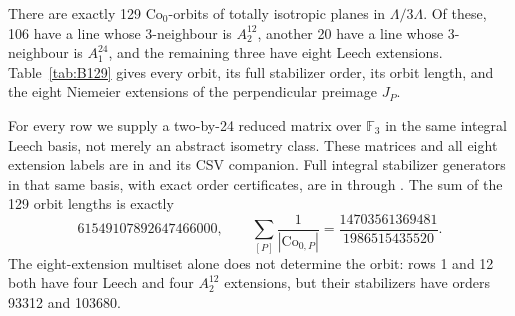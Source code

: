 \begin{statement}
There are exactly 129 \(\mathrm{Co}_0\)-orbits of totally isotropic
planes in \(\Lambda/3\Lambda\). Of these, 106 have a line whose
3-neighbour is \(A_2^{12}\), another 20 have a line whose
3-neighbour is \(A_1^{24}\), and the remaining three have eight
Leech extensions. Table~\ref{tab:B129} gives every orbit, its full
stabilizer order, its orbit length, and the eight Niemeier extensions
of the perpendicular preimage \(J_P\).

For every row we supply a two-by-24 reduced matrix over \(\mathbb F_3\)
in the same integral Leech basis, not merely an abstract isometry
class. These matrices and all eight extension labels are in
 and its CSV companion.
Full integral stabilizer generators in that same basis, with exact
order certificates, are in 
through . The sum of the 129
orbit lengths is exactly
\[
 61549107892647466000,
 \qquad
 \sum_{[P]}\frac1{|\mathrm{Co}_{0,P}|}
   =\frac{14703561369481}{1986515435520}.
\]
The eight-extension multiset alone does not determine the orbit:
rows 1 and 12 both have four Leech and four \(A_2^{12}\) extensions,
but their stabilizers have orders 93312 and 103680.
\end{statement}

